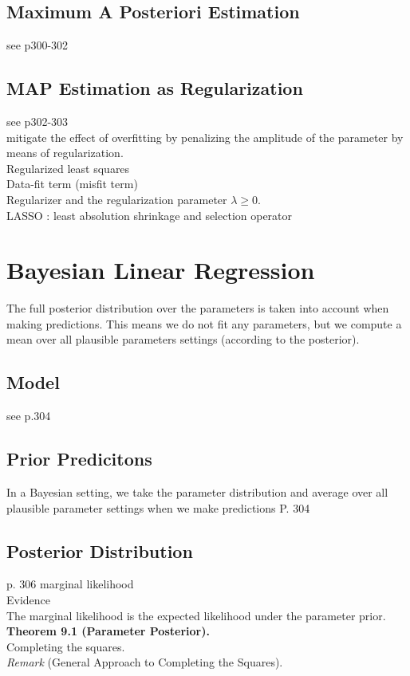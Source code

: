 \subsection{Maximum A Posteriori Estimation}
see p300-302 \\
\subsection{MAP Estimation as Regularization}
see p302-303 \\
mitigate the effect of overfitting by penalizing the amplitude of the parameter by means of regularization. \\
Regularized least squares \\ 
Data-fit term (misfit term) \\
Regularizer and the regularization parameter $\lambda \ge 0$.\\
LASSO : least absolution shrinkage and selection operator\\
\section{Bayesian Linear Regression}
The full posterior distribution over the parameters is taken into account when making predictions.
This means we do not fit any parameters, but we compute a mean over all plausible parameters settings (according to the posterior). \\
\subsection{Model} 
see p.304
\subsection{Prior Predicitons}
In a Bayesian setting, we take the parameter distribution and average over all plausible parameter settings when we make predictions
P. 304
\subsection{Posterior Distribution}
p. 306
marginal likelihood \\
Evidence \\
The marginal  likelihood is the  expected likelihood under the parameter  prior.\\
\textbf{Theorem 9.1 (Parameter Posterior).} \\
Completing the squares. \\
\textit{Remark} (General Approach to Completing the Squares). \\
